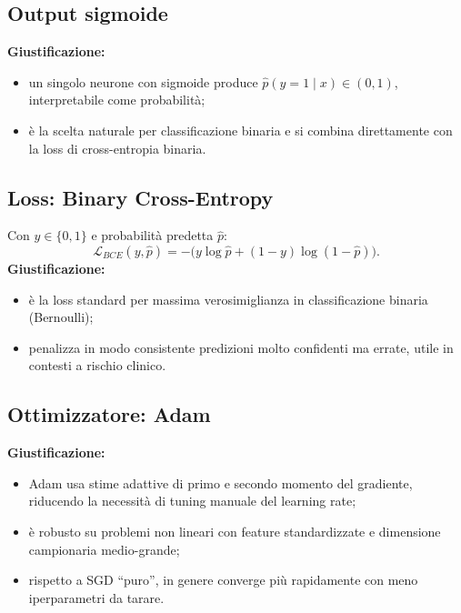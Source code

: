 \subsection{Output sigmoide}
\textbf{Giustificazione:}
\begin{itemize}
  \item un singolo neurone con sigmoide produce $\hat{p}(y=1\mid x)\in(0,1)$, interpretabile come probabilità;
  \item è la scelta naturale per classificazione binaria e si combina direttamente con la loss di cross-entropia binaria.
\end{itemize}

\subsection{Loss: Binary Cross-Entropy}
Con $y\in\{0,1\}$ e probabilità predetta $\hat{p}$:
\begin{equation}
\mathcal{L}_{BCE}(y,\hat{p}) = -\big(y\log \hat{p} + (1-y)\log(1-\hat{p})\big).
\end{equation}
\textbf{Giustificazione:}
\begin{itemize}
  \item è la loss standard per massima verosimiglianza in classificazione binaria (Bernoulli);
  \item penalizza in modo consistente predizioni molto confidenti ma errate, utile in contesti a rischio clinico.
\end{itemize}

\subsection{Ottimizzatore: Adam}
\textbf{Giustificazione:}
\begin{itemize}
  \item Adam usa stime adattive di primo e secondo momento del gradiente, riducendo la necessità di tuning manuale del learning rate;
  \item è robusto su problemi non lineari con feature standardizzate e dimensione campionaria medio-grande;
  \item rispetto a SGD ``puro'', in genere converge più rapidamente con meno iperparametri da tarare.
\end{itemize}

